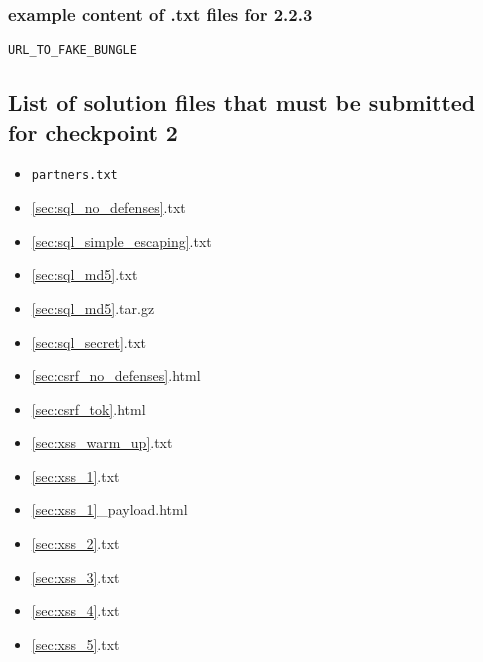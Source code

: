 \documentclass[letterpaper,12pt]{report}
\begin{document}
\subsubsection*{example content of .txt files for 2.2.3}
\begin{mdframed}
\begin{Verbatim}
URL_TO_FAKE_BUNGLE
\end{Verbatim}
\end{mdframed}

\pagebreak

\subsection*{List of solution files that must be submitted for checkpoint 2}

\begin{itemize}
\item {\tt partners.txt}
\item {\ref{sec:sql_no_defenses}.txt}
\item {\ref{sec:sql_simple_escaping}.txt}
\item {\ref{sec:sql_md5}.txt}
\item {\ref{sec:sql_md5}.tar.gz}
\item {\ref{sec:sql_secret}.txt}
\item {\ref{sec:csrf_no_defenses}.html}
\item {\ref{sec:csrf_tok}.html}
\item {\ref{sec:xss_warm_up}.txt}
\item {\ref{sec:xss_1}.txt}
\item {\ref{sec:xss_1}\_payload.html}
\item {\ref{sec:xss_2}.txt}
\item {\ref{sec:xss_3}.txt}
\item {\ref{sec:xss_4}.txt}
\item {\ref{sec:xss_5}.txt}
\end{itemize}
\end{document}

